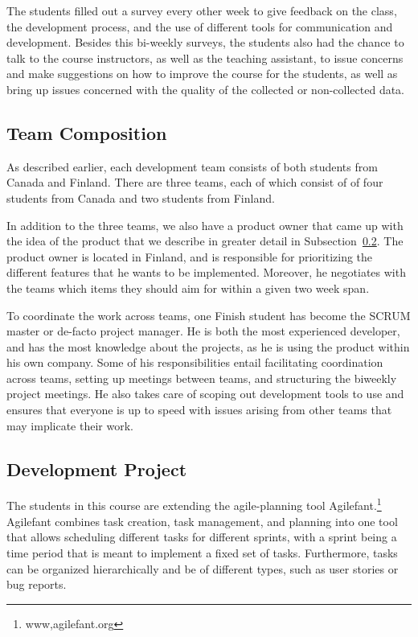 The students filled out a survey every other week to give feedback on the class, the development process, and the use of different tools for communication and development.
Besides this bi-weekly surveys, the students also had the chance to talk to the course instructors, as well as the teaching assistant, to issue concerns and make suggestions on how to improve the course for the students, as well as bring up issues concerned with the quality of the collected or non-collected data.

\subsection{Team Composition}
As described earlier, each development team consists of both students from Canada and Finland.
There are three teams, each of which consist of of four students from Canada and two students from Finland.

In addition to the three teams, we also have a product owner that came up with the idea of the product that we describe in greater detail in Subsection~\ref{chap:make:subset:devproject}.
The product owner is located in Finland, and is responsible for prioritizing the different features that he wants to be implemented.
Moreover, he negotiates with the teams which items they should aim for within a given two week span. 

To coordinate the work across teams, one Finish student has become the SCRUM master or de-facto project manager.
He is both the most experienced developer, and has the most knowledge about the projects, as he is using the product within his own company.
Some of his responsibilities entail facilitating coordination across teams,  setting up meetings between teams, and structuring the biweekly project meetings.
He also takes care of scoping out development tools to use and ensures that everyone is up to speed with issues arising from other teams that may implicate their work.

\subsection{Development Project}
\label{chap:make:subset:devproject}
The students in this course are extending the agile-planning tool Agilefant.\footnote{www,agilefant.org}
Agilefant combines task creation, task management, and planning into one tool that allows scheduling different tasks for different sprints, with a sprint being a time period that is meant to implement a fixed set of tasks.
Furthermore, tasks can be organized hierarchically and be of different types, such as user stories or bug reports.
 
